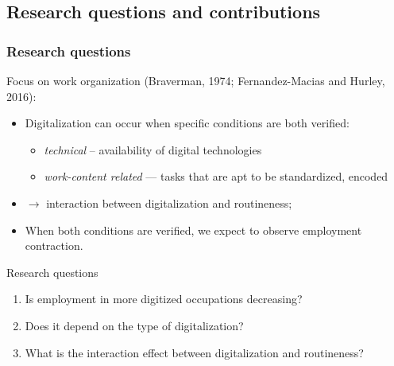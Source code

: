 \documentclass[10pt,xcolor={usenames,dvipsnames}]{beamer}
\begin{document}
\subsection{Research questions and contributions}
\begin{frame}
\frametitle{Research questions}

Focus on work organization (Braverman, 1974; Fernandez-Macias and Hurley, 2016):
\begin{itemize}
    \item Digitalization can occur when specific conditions are both verified:
    \begin{itemize}
        \item \emph{technical} -- availability of digital technologies
        \item \emph{work-content related} --- tasks that are apt to be standardized, encoded
    \end{itemize}
    \item $\rightarrow$ interaction between digitalization and routineness;
    \item When both conditions are verified, we expect to observe employment contraction.
\end{itemize}
\medskip
\begin{exampleblock}{Research questions}
\begin{enumerate}
    \item Is employment in more digitized occupations decreasing?
    \item Does it depend on the type of digitalization?
    \item What is the interaction effect between digitalization and routineness?
\end{enumerate}
\end{exampleblock}
\end{frame}
\end{document}
